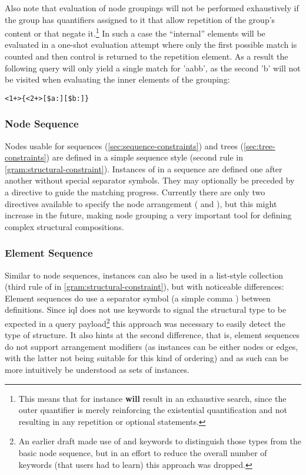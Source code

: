 \documentclass[11pt,a4paper]{report}
\begin{document}
Also note that evaluation of node groupings will not be performed exhaustively if the group has quantifiers assigned to it that allow repetition of the group's content or that negate it.\footnote{This means that for instance  \textbf{will} result in an exhaustive search, since the outer quantifier is merely reinforcing the existential quantification and not resulting in any repetition or optional statements.}
In such a case the ``internal'' elements will be evaluated in a one-shot evaluation attempt where only the first possible match is counted and then control is returned to the repetition element.
As a result the following query will only yield a single match for 'aabb', as the second 'b' will not be visited when evaluating the inner elements of the grouping:
\begin{Verbatim}
<1+>{<2+>[$a:][$b:]}
\end{Verbatim}

\subsubsection{Node Sequence}
\label{sec:node-sequences}
\noindent Nodes usable for sequences (\ref{sec:sequence-constraints}) and trees (\ref{sec:tree-constraints}) are defined in a simple sequence style (second  rule in \cref{gram:structural-constraint}).
Instances of  in a sequence are defined one after another without special separator symbols.
They may optionally be preceded by a  directive to guide the matching progress.
Currently there are only two directives available to specify the node arrangement ( and ), but this might increase in the future, making node grouping a very important tool for defining complex structural compositions.

\subsubsection{Element Sequence}
\label{sec:element-sequence}
\noindent Similar to node sequences,  instances can also be used in a list-style collection (third rule of  in \cref{gram:structural-constraint}), but with noticeable differences: 
Element sequences do use a separator symbol (a simple comma \lit{,}) between  definitions.
Since \ac{iql} does not use keywords to signal the structural type to be expected in a query payload\footnote{An earlier draft made use of  and  keywords to distinguish those types from the basic node sequence, but in an effort to reduce the overall number of keywords (that users had to learn) this approach was dropped.} this approach was necessary to easily detect the type of structure.
It also hints at the second difference, that is, element sequences do not support arrangement modifiers (as  instances can be either nodes or edges, with the latter not being suitable for this kind of ordering) and as such can be more intuitively be understood as sets of  instances.
\end{document}
